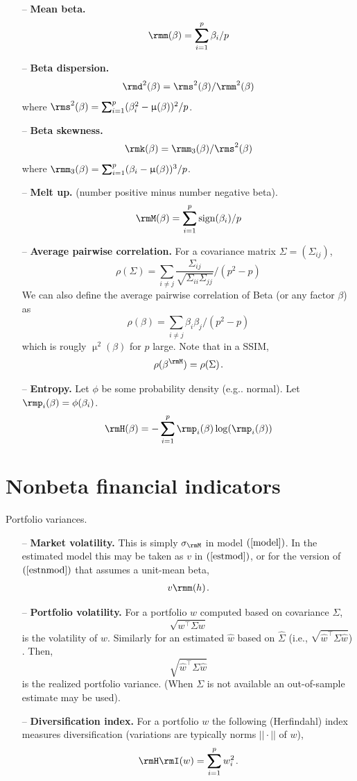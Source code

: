 \documentclass[leqno,12pt]{article}
\begin{document}
{\begin{itemize}
  \item[--] {\bf Mean beta.}
 \[ \rmm(\beta) = \sum_{i=1}^p \beta_i /p \]
  \item[--] {\bf Beta dispersion.}
   \[ \rmd^2(\beta) = \rms^2(\beta)/\rmm^2(\beta) \]
  where 
$\rms^2(\beta) = \sum_{i=1}^p (\beta^2_i 
  -\upmu(\beta))^2/p$.
  \item[--] {\bf Beta skewness.}
  \[ \rmk(\beta) = \rmm_3(\beta)/\rms^2(\beta) \]
  where $\rmm_3(\beta) = \sum_{i=1}^p 
  (\beta_i - \upmu(\beta))^3/p$.
  \item[--] {\bf Melt up.} (number positive minus number negative beta).
   \[ \rmM (\beta) = \sum_{i=1}^p \text{sign}(\beta_i) /p \]
  \item[--] {\bf Average pairwise correlation.} For a covariance
matrix $\Sigma = (\Sigma_{ij})$,
 \[ \rho(\Sigma) = \sum_{i\neq j} \frac{\Sigma_{ij}}
{\sqrt{\Sigma_{ii}\Sigma_{jj}}}/(p^2-p) \]
We can also define the average pairwise correlation of Beta
(or any factor $\beta$) as
  \[ \rho(\beta) = \sum_{i\neq j} \beta_i \beta_j
   / (p^2-p) \]
which is rougly $\upmu^2(\beta)$ for $p$ large.
Note that in a SSIM, \[ \rho(\mb) = \rho(\Sigma)\s . \]
 \item[--] {\bf Entropy.} Let $\phi$ be some probability density
(e.g.. normal). 
Let $\rmp_i(\beta) = \phi(\beta_i)$.
  \[ \rmH(\beta) = -\sum_{i=1}^p \rmp_i(\beta) 
\log (\rmp_i(\beta)) \]
\end{itemize}

\section{Nonbeta financial indicators}
Portfolio variances.

\begin{itemize}
\item[--] {\bf Market volatility.} This is simply $\mv$ in
model $\req{model}$. In the estimated model this may be taken
as $v$ in $\req{estmod}$, or for the version of $\req{estnmod}$
that assumes a unit-mean beta,
\begin{align}
   v \rmm(h) \s .
\end{align}
\item[--] {\bf Portfolio volatility.} For a portfolio
$w$ computed based on covariance $\Sigma$,
\[
 \sqrt{w^\top  \Sigma w}
\]
is the volatility of $w$. Similarly for an estimated 
$\hat{w}$ based on $\hat{\Sigma}$ (i.e.,
$\sqrt{\hat{w}^\top  \Sigma \hat{w}}$)
. Then,
\[
 \sqrt{\hat{w}^\top  \Sigma \hat{w}}
\]
is the realized portfolio variance. (When $\Sigma$ is 
not available an out-of-sample estimate may be used).
\item[--] {\bf Diversification index.} For a portfolio
$w$ the following (Herfindahl) index measures diversification
(variations are typically norms $|| \cdot ||$ of $w$),
\[ \rmH\rmI(w) = \sum_{i=1}^p w_i^2 \s .
\]
\end{itemize}

}
\end{document}
